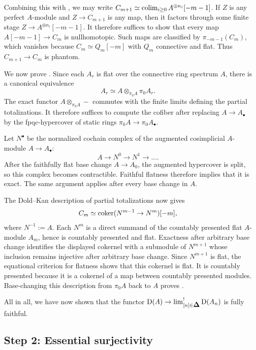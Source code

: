 \documentclass[11pt]{book}
\begin{document}
	Combining this with , we may write $C_{m+1} \simeq \operatorname{colim}_{i \geq 0} A^{\oplus n_i}[-m-1]$. If $Z$ is any perfect $A$-module and $Z \to C_{m+1}$ is any map, then it factors through some finite stage $Z \to A^{\oplus n_i}[-m-1]$. It therefore suffices to show that every map $A[-m-1] \to C_m$ is nullhomotopic. Such maps are classified by $\pi_{-m-1}(C_m)$, which vanishes because $C_m \simeq Q_m[-m]$ with $Q_m$ connective and flat. Thus $C_{m+1} \to C_m$ is phantom.

	We now prove . Since each $A_r$ is flat over the connective ring spectrum $A$, there is a canonical equivalence
	\[
		A_r \simeq A \otimes_{\pi_0 A} \pi_0 A_r.
	\]
	The exact functor $A \otimes_{\pi_0 A} -$ commutes with the finite limits defining the partial totalizations. It therefore suffices to compute the cofiber after replacing $A \to A_\bullet$ by the fpqc-hypercover of static rings $\pi_0 A \to \pi_0 A_\bullet$.

	Let $N^{\bullet}$ be the normalized cochain complex of the augmented cosimplicial $A$-module $A \to A_{\bullet}$:
	\[
		A \to N^0 \to N^1 \to \dots.
	\]
	After the faithfully flat base change $A \to A_0$, the augmented hypercover is split, so this complex becomes contractible. Faithful flatness therefore implies that it is exact. The same argument applies after every base change in $A$.

	The Dold--Kan description of partial totalizations now gives
	\[
		C_m \simeq \operatorname{coker}(N^{m-1} \to N^m)[-m],
	\]
		where $N^{-1}:=A$. Each $N^m$ is a direct summand of the countably presented flat $A$-module $A_m$, hence is countably presented and flat. Exactness after arbitrary base change identifies the displayed cokernel with a submodule of $N^{m+1}$ whose inclusion remains injective after arbitrary base change. Since $N^{m+1}$ is flat, the equational criterion for flatness shows that this cokernel is flat. It is countably presented because it is a cokernel of a map between countably presented modules. Base-changing this description from $\pi_0 A$ back to $A$ proves .

	All in all, we have now shown that the functor $\D(A) \to \lim_{[n] \in \simp}^! \D(A_n)$ is fully faithful.

	\subsection{Step 2: Essential surjectivity}
\end{document}
